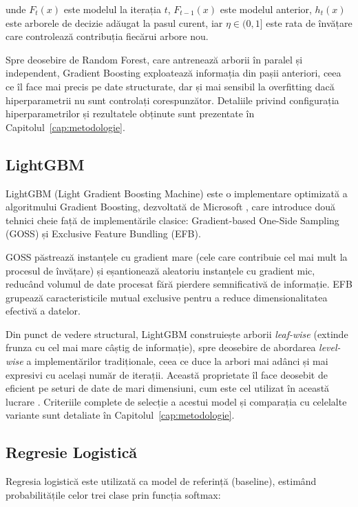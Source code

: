 unde $F_t(x)$ este modelul la iterația $t$, $F_{t-1}(x)$ este modelul
anterior, $h_t(x)$ este arborele de decizie adăugat la pasul curent, iar
$\eta \in (0, 1]$ este rata de învățare care controlează contribuția
fiecărui arbore nou.

Spre deosebire de Random Forest, care antrenează arborii în paralel și
independent, Gradient Boosting exploatează informația din pașii anteriori,
ceea ce îl face mai precis pe date structurate, dar și mai sensibil la
overfitting dacă hiperparametrii nu sunt controlați corespunzător.
Detaliile privind configurația hiperparametrilor și rezultatele obținute
sunt prezentate în Capitolul~\ref{cap:metodologie}.

\subsection{LightGBM}

LightGBM (Light Gradient Boosting Machine) este o implementare optimizată
a algoritmului Gradient Boosting, dezvoltată de Microsoft \cite{Ke2017},
care introduce două tehnici cheie față de implementările clasice:
Gradient-based One-Side Sampling (GOSS) și Exclusive Feature Bundling (EFB).

GOSS păstrează instanțele cu gradient mare (cele care contribuie cel mai
mult la procesul de învățare) și eșantionează aleatoriu instanțele cu
gradient mic, reducând volumul de date procesat fără pierdere semnificativă
de informație. EFB grupează caracteristicile mutual exclusive pentru a reduce
dimensionalitatea efectivă a datelor.

Din punct de vedere structural, LightGBM construiește arborii
\textit{leaf-wise} (extinde frunza cu cel mai mare câștig de informație),
spre deosebire de abordarea \textit{level-wise} a implementărilor
tradiționale, ceea ce duce la arbori mai adânci și mai expresivi cu același
număr de iterații. Această proprietate îl face deosebit de eficient pe
seturi de date de mari dimensiuni, cum este cel utilizat în această lucrare
\cite{StatsBomb}. Criteriile complete de selecție a acestui model și
comparația cu celelalte variante sunt detaliate în
Capitolul~\ref{cap:metodologie}.

\subsection{Regresie Logistică}

Regresia logistică este utilizată ca model de referință (baseline),
estimând probabilitățile celor trei clase prin funcția softmax:

